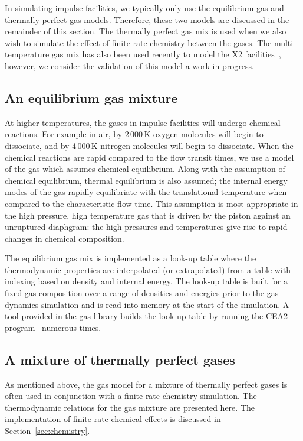 In simulating impulse facilities, we typically only use the equilibrium gas and thermally perfect gas models.
Therefore, these two models are discussed in the remainder of this section.
The thermally perfect gas mix is used when we also wish to simulate the effect of finite-rate chemistry
between the gases.
The multi-temperature gas mix has also been used recently to model the X2 facilities~\cite{potter_etal_08}, however, we consider
the validation of this model a work in progress.

\subsection{An equilibrium gas mixture}
At higher temperatures, the gases in impulse facilities will undergo chemical reactions.
For example in air, by 2\,000\,K oxygen molecules will begin to dissociate, and
by 4\,000\,K nitrogen molecules will begin to dissociate.
When the chemical reactions are rapid compared to the flow transit times, we use a model
of the gas which assumes chemical equilibrium.
Along with the assumption of chemical equilibrium, thermal equilibrium is also assumed;
the internal energy modes of the gas rapidly equilibriate with the translational temperature
when compared to the characteristic flow time.
This assumption is most appropriate in the high pressure, high temperature gas that is driven by
the piston against an unruptured diaphgram: the high pressures and temperatures give rise
to rapid changes in chemical composition.

\medskip
The equilibrium gas mix is implemented as a look-up table where the thermodynamic properties
are interpolated (or extrapolated) from a table with indexing based on density and internal
energy.
The look-up table is built for a fixed gas composition over a range of densities
and energies prior to the gas dynamics simulation and is read into memory
at the start of the simulation.
A tool provided in the gas library builds the look-up table by running the CEA2 program~\cite{mcbride_gordon_96}
numerous times.

%
\subsection{A mixture of thermally perfect gases}
As mentioned above, the gas model for a mixture of thermally perfect gases is often used in conjunction
with a finite-rate chemistry simulation.
The thermodynamic relations for the gas mixture are presented here.
The implementation of finite-rate chemical effects is discussed in Section~\ref{sec:chemistry}.

